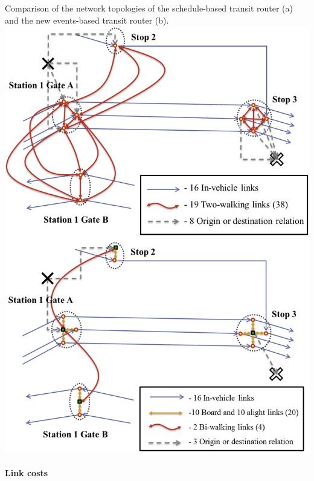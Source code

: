 \createfigure
{}
{Comparison of the network topologies of the schedule-based transit router (a) and the new events-based transit router (b).}
{\label{fig:Networks}}
{\includegraphics[width=1.0\textwidth]{extending/figures/ebr/Networks.png}}
{}

\paragraph{Link costs}

